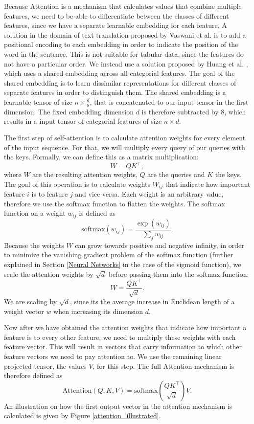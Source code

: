 Because Attention is a mechanism that calculates values that combine multiple features, we need to be able to differentiate between the classes of different features, since we have a separate learnable embedding for each feature. A solution in the domain of text translation proposed by Vaswani et al. \cite{attention_is_all_you_need} is to add a positional encoding to each embedding in order to indicate the position of the word in the sentence. This is not suitable for tabular data, since the features do not have a particular order. We instead use a solution proposed by Huang et al. \cite{tab_transformer}, which uses a shared embedding across all categorial features. The goal of the shared embedding is to learn dissimilar representations for different classes of separate features in order to distinguish them. The shared embedding is a learnable tensor of size $n \times \frac{d}{8}$, that is concatenated to our input tensor in the first dimension. The fixed embedding dimension $d$ is therefore subtracted by 8, which results in a input tensor of categorial features of size $n \times d$. 

The first step of self-attention is to calculate attention weights for every element of the input sequence. For that, we will multiply every query of our queries with the keys. Formally, we can define this as a matrix multiplication:
$$W = QK^\intercal,$$
where $W$ are the resulting attention weights, $Q$ are the queries and $K$ the keys. The goal of this operation is to calculate weights $W_{ij}$ that indicate how important feature $i$ is to feature $j$ and vice versa. Each weight is an arbitrary value, therefore we use the softmax function \cite{neural_networks_pattern_recognition} to flatten the weights. The softmax function on a weight $w_{ij}$ is defined as
$$\text{softmax}(w_{ij}) = \frac{\exp(w_{ij})}{\sum_j{w_{ij}}}.$$
Because the weights $W$ can grow towards positive and negative infinity, in order to minimize the vanishing gradient problem of the softmax function (further explained in Section \ref{Neural Networks} in the case of the sigmoid function), we scale the attention weights by $\sqrt{d}$ before passing them into the softmax function:
$$W = \frac{QK^\intercal}{\sqrt{d}}.$$
We are scaling by $\sqrt{d}$, since its the average increase in Euclidean length of a weight vector $w$ when increasing its dimension $d$. \cite{attention_is_all_you_need}

Now after we have obtained the attention weights that indicate how important a feature is to every other feature, we need to multiply these weights with each feature vector. This will result in vectors that carry information to which other feature vectors we need to pay attention to. We use the remaining linear projected tensor, the values $V$, for this step. The full Attention mechanism is therefore defined as
$$\text{Attention}(Q, K, V) = \text{softmax}(\frac{QK^\intercal}{\sqrt{d}})V.$$
An illustration on how the first output vector in the attention mechanism is calculated is given by Figure \ref{attention_illustrated}.

